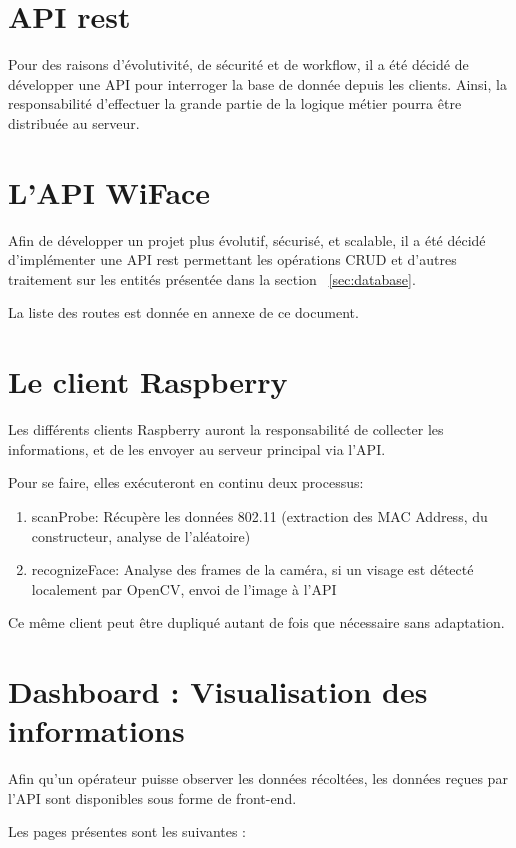 \section{API rest}

Pour des raisons d’évolutivité, de sécurité et de workflow, il a été décidé de développer une API pour interroger la
base de donnée depuis les clients. Ainsi, la responsabilité d’effectuer la grande partie de la logique métier pourra
être distribuée au serveur.

\section{L'API WiFace}

Afin de développer un projet plus évolutif, sécurisé, et scalable, il a été décidé d'implémenter une API rest permettant les opérations CRUD et d'autres
traitement sur les entités présentée dans la section ~\ref{sec:database}.

La liste des routes est donnée en annexe de ce document.

\section{Le client Raspberry}
Les différents clients Raspberry auront la responsabilité de collecter les informations, et de les envoyer
au serveur principal via l'API. 

Pour se faire, elles exécuteront en continu deux processus:
\begin{enumerate}
	\item scanProbe: Récupère les données 802.11 (extraction des MAC Address, du constructeur, analyse de l'aléatoire)
	\item recognizeFace: Analyse des frames de la caméra, si un visage est détecté localement par OpenCV, envoi de l'image à l'API
\end{enumerate}

Ce même client peut être dupliqué autant de fois que nécessaire sans adaptation. 

\section{Dashboard : Visualisation des informations}
Afin qu'un opérateur puisse observer les données récoltées, les données reçues par l'API sont disponibles sous forme de front-end.

Les pages présentes sont les suivantes : 

